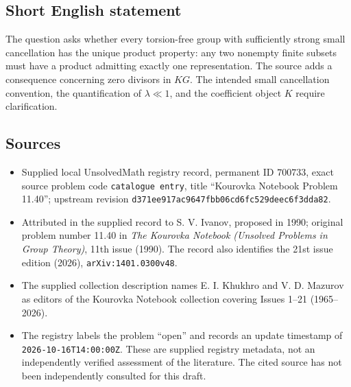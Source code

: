 \documentclass[11pt]{article}
\begin{document}
\subsection{Short English statement}
The question asks whether every torsion-free group with sufficiently strong small cancellation has the unique product property: any two nonempty finite subsets must have a product admitting exactly one representation. The source adds a consequence concerning zero divisors in \(KG\). The intended small cancellation convention, the quantification of \(\lambda\ll1\), and the coefficient object \(K\) require clarification.
\subsection{Sources}
\begin{itemize}
\item Supplied local UnsolvedMath registry record, permanent ID \(700733\), exact source problem code \texttt{catalogue entry}, title ``Kourovka Notebook Problem 11.40''; upstream revision \texttt{d371ee917ac9647fbb06cd6fc529deec6f3dda82}.
\item Attributed in the supplied record to S. V. Ivanov, proposed in 1990; original problem number 11.40 in \emph{The Kourovka Notebook (Unsolved Problems in Group Theory)}, 11th issue (1990). The record also identifies the 21st issue edition (2026), \texttt{arXiv:1401.0300v48}.
\item The supplied collection description names E. I. Khukhro and V. D. Mazurov as editors of the Kourovka Notebook collection covering Issues 1--21 (1965--2026).
\item The registry labels the problem ``open'' and records an update timestamp of \texttt{2026-10-16T14:00:00Z}. These are supplied registry metadata, not an independently verified assessment of the literature. The cited source has not been independently consulted for this draft.
\end{itemize}
\end{document}
